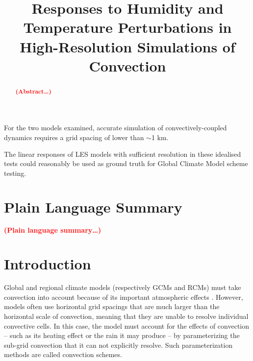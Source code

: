 \documentclass[draft]{agujournal2019}
\newcommand{\todo}[1]{\textcolor{red}{\textbf{(#1)}}}
\begin{document}
\title{Responses to Humidity and Temperature Perturbations in High-Resolution Simulations of Convection}




\begin{keypoints}
    \item For the two models examined, accurate simulation of
    convectively-coupled dynamics requires a grid spacing of lower than $\sim$1
    km.
    \item The linear responses of LES models with sufficient resolution in these
    idealised tests could reasonably be used as ground truth for Global Climate
    Model scheme testing.
\end{keypoints}

\justifying
\begin{abstract}
\todo{Abstract\ldots}
\end{abstract}

\section*{Plain Language Summary}
\todo{Plain language summary\ldots}

\section{Introduction}

Global and regional climate models (respectively GCMs and RCMs) must take
convection into account because of its important atmospheric effects
\cite{Manabe_JAS_1964, Wallace_2006}. However, models often use horizontal grid
spacings that are much larger than the horizontal scale of convection, meaning
that they are unable to resolve individual convective cells. In this case, the
model must account for the effects of convection -- such as its heating effect
or the rain it may produce -- by parameterizing the sub-grid convection that it
can not explicitly resolve. Such parameterization methods are called convection
schemes. 
\end{document}
